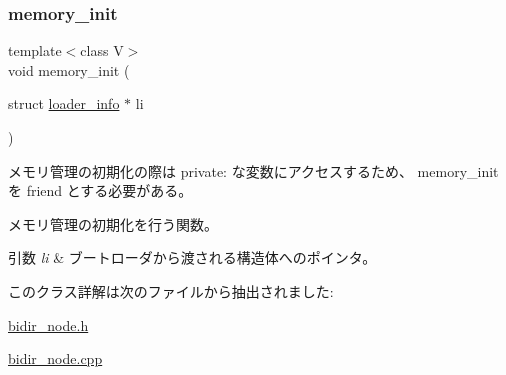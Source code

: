 \subsubsection{\texorpdfstring{memory\+\_\+init}{memory\_init}}
{\footnotesize\ttfamily template$<$class V$>$ \\
void memory\+\_\+init (\begin{DoxyParamCaption}\item[{struct \hyperlink{structloader__info}{loader\+\_\+info} $\ast$}]{li }\end{DoxyParamCaption})\hspace{0.3cm}{\ttfamily [friend]}}

メモリ管理の初期化の際は private\+: な変数にアクセスするため、 memory\+\_\+init を friend とする必要がある。

メモリ管理の初期化を行う関数。 
\begin{DoxyParams}{引数}
{\em li} & ブートローダから渡される構造体へのポインタ。 \\
\hline
\end{DoxyParams}


このクラス詳解は次のファイルから抽出されました\+:\begin{DoxyCompactItemize}
\item 
\hyperlink{bidir__node_8h}{bidir\+\_\+node.\+h}\item 
\hyperlink{bidir__node_8cpp}{bidir\+\_\+node.\+cpp}\end{DoxyCompactItemize}
